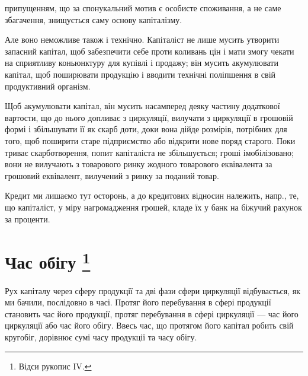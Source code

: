\parcont{}  %
припущенням, що за спонукальний мотив є особисте споживання, а не
саме збагачення, знищується саму основу капіталізму.

Але воно неможливе також і технічно. Капіталіст не лише мусить
утворити запасний капітал, щоб забезпечити себе проти коливань цін і
мати змогу чекати на сприятливу коньюнктуру для купівлі і продажу;
він мусить акумулювати капітал, щоб поширювати продукцію і вводити
технічні поліпшення в свій продуктивний організм.

Щоб акумулювати капітал, він мусить насамперед деяку частину додаткової
вартости, що до нього допливає з циркуляції, вилучати з циркуляції
в грошовій формі і збільшувати її як скарб доти, доки вона
дійде розмірів, потрібних для того, щоб поширити старе підприємство або
відкрити нове поряд старого. Поки триває скарботворення, попит капіталіста
не збільшується; гроші імобілізовано; вони не вилучають з товарового
ринку жодного товарового еквівалента за грошовий еквівалент, вилучений
з ринку за поданий товар.

Кредит ми лишаємо тут осторонь, а до кредитових відносин належить,
напр., те, що капіталіст, у міру нагромадження грошей, кладе їх у банк
на біжучий рахунок за проценти.

\section{Час обігу
\footnote{Відси рукопис IV.}
}

Рух капіталу через сферу продукції та дві фази сфери циркуляції
відбувається, як ми бачили, послідовно в часі. Протяг його перебування в
сфері продукції становить час його продукції, протяг перебування в
сфері циркуляції — час його циркуляції або час його обігу. Ввесь час, що
протягом його капітал робить свій кругобіг, дорівнює сумі часу продукції
та часу обігу.

